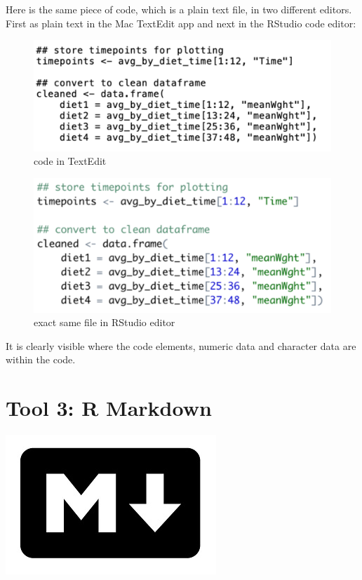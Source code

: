 \documentclass[]{book}
\begin{document}
Here is the same piece of code, which is a plain text file, in two different editors. First as plain text in the Mac TextEdit app and next in the RStudio code editor:

\begin{figure}
\centering
\includegraphics{figures/R_code_plain.png}
\caption{code in TextEdit}
\end{figure}

\begin{figure}
\centering
\includegraphics{figures/R_code_highlighted.png}
\caption{exact same file in RStudio editor}
\end{figure}

It is clearly visible where the code elements, numeric data and character data are within the code.

\hypertarget{tool-3-r-markdown}{%
\section{Tool 3: R Markdown}\label{tool-3-r-markdown}}

\includegraphics{figures/markdown_logo.jpg}
\end{document}
